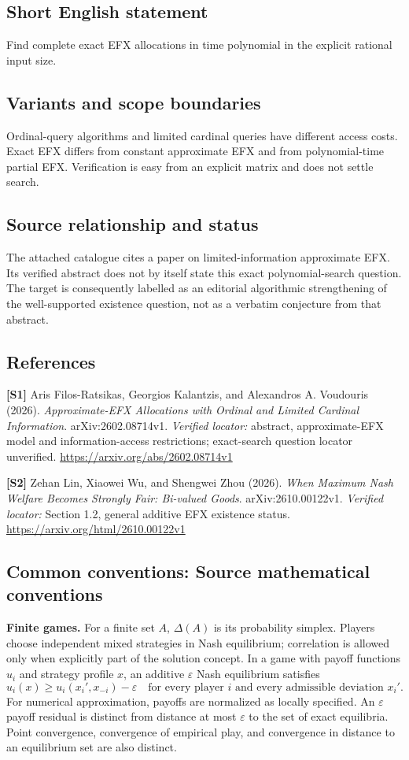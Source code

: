 \documentclass[11pt,a4paper]{article}
\begin{document}
\subsection*{Short English statement}
Find complete exact EFX allocations in time polynomial in the explicit rational input size.
\subsection*{Variants and scope boundaries}
Ordinal-query algorithms and limited cardinal queries have different access costs. Exact EFX differs from constant approximate EFX and from polynomial-time partial EFX. Verification is easy from an explicit matrix and does not settle search.
\subsection*{Source relationship and status}
The attached catalogue cites a paper on limited-information approximate EFX. Its verified abstract does not by itself state this exact polynomial-search question. The target is consequently labelled as an editorial algorithmic strengthening of the well-supported existence question, not as a verbatim conjecture from that abstract.
\subsection*{References}
\begingroup\footnotesize\raggedright
\textbf{[S1]} Aris Filos-Ratsikas, Georgios Kalantzis, and Alexandros A. Voudouris (2026). \emph{Approximate-EFX Allocations with Ordinal and Limited Cardinal Information}. arXiv:2602.08714v1. \textit{Verified locator:} abstract, approximate-EFX model and information-access restrictions; exact-search question locator unverified. \url{https://arxiv.org/abs/2602.08714v1}
\par\textbf{[S2]} Zehan Lin, Xiaowei Wu, and Shengwei Zhou (2026). \emph{When Maximum Nash Welfare Becomes Strongly Fair: Bi-valued Goods}. arXiv:2610.00122v1. \textit{Verified locator:} Section 1.2, general additive EFX existence status. \url{https://arxiv.org/html/2610.00122v1}
\par\endgroup

\subsection*{Common conventions: Source mathematical conventions}

\textbf{Finite games.} For a finite set $A$, $\Delta(A)$ is its probability
simplex. Players choose independent mixed strategies in Nash equilibrium;
correlation is allowed only when explicitly part of the solution concept.
In a game with payoff functions $u_i$ and strategy profile $x$, an additive
$\varepsilon$ Nash equilibrium satisfies
\[
 u_i(x)\geq u_i(x_i',x_{-i})-\varepsilon
 \quad\text{for every player $i$ and every admissible deviation $x_i'$}.
\]
For numerical approximation, payoffs are normalized as locally specified.
An $\varepsilon$ payoff residual is distinct from distance at most
$\varepsilon$ to the set of exact equilibria. Point convergence, convergence
of empirical play, and convergence in distance to an equilibrium set are
also distinct.
\end{document}
